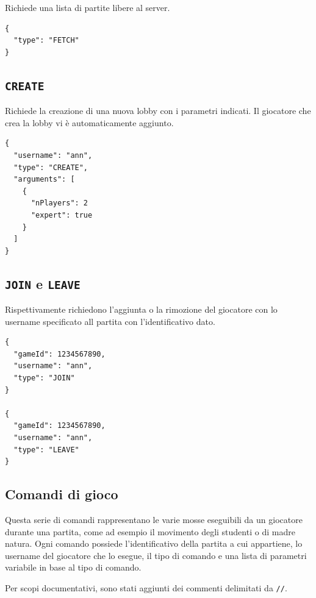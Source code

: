 \documentclass[a4paper,12pt]{article}
\begin{document}
Richiede una lista di partite libere al server.

\begin{verbatim}
{
  "type": "FETCH"
}
\end{verbatim}

\subsection{\texttt{CREATE}}

Richiede la creazione di una nuova lobby con i parametri indicati. Il
giocatore che crea la lobby vi è automaticamente aggiunto.

\begin{verbatim}
{
  "username": "ann",
  "type": "CREATE",
  "arguments": [
    {
      "nPlayers": 2
      "expert": true
    }
  ]
}
\end{verbatim}

\subsection{\texttt{JOIN} e \texttt{LEAVE}}

Rispettivamente richiedono l'aggiunta o la rimozione del giocatore con lo
username specificato all partita  con l'identificativo dato.

\begin{verbatim}
{
  "gameId": 1234567890,
  "username": "ann",
  "type": "JOIN"
}

{
  "gameId": 1234567890,
  "username": "ann",
  "type": "LEAVE"
}
\end{verbatim}

\subsection{Comandi di gioco}

Questa serie di comandi rappresentano le varie mosse eseguibili da un
giocatore durante una partita, come ad esempio il movimento degli studenti
o di madre natura. Ogni comando possiede l'identificativo della partita a cui
appartiene, lo username del giocatore che lo esegue, il tipo di comando e
una lista di parametri variabile in base al tipo di comando.

Per scopi documentativi, sono stati aggiunti dei commenti delimitati da
\texttt{//}.
\end{document}
